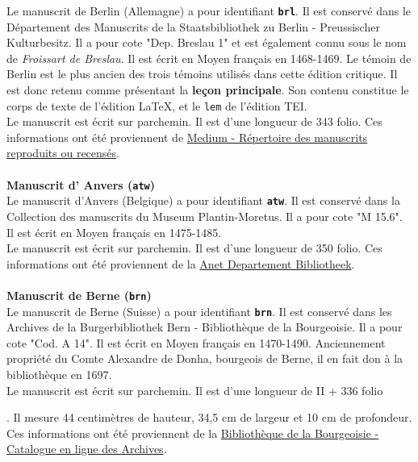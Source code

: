 \documentclass[12pt, a4paper]{article}
\begin{document}
	\indent Le manuscrit de Berlin (Allemagne) a pour identifiant \textbf{\texttt{brl}}. Il est conservé dans le Département des Manuscrits de la  Staatsbibliothek zu Berlin - Preussischer Kulturbesitz. Il a pour cote "Dep. Breslau 1" et est également connu sous le nom de \textit{Froissart de Breslau}. Il est écrit en Moyen français en 1468-1469. Le témoin de Berlin est le plus ancien des trois témoins utilisés dans cette édition critique. Il est donc retenu comme présentant la \textbf{leçon principale}.
	Son contenu constitue le corps de texte de l'édition \LaTeX, et
	le \texttt{lem} de l'édition TEI.\\ \indent Le manuscrit est écrit sur parchemin. Il est d'une longueur de 343 folio. Ces informations ont été proviennent de \href{http://medium-avance.irht.cnrs.fr/ark:/63955/md44pk02gf53}{Medium - Répertoire des manuscrits reproduits ou recensés}.\\~\\\noindent \textbf{Manuscrit d' Anvers (\texttt{atw})}\\
	
	\indent Le manuscrit d'Anvers (Belgique) a pour identifiant \textbf{\texttt{atw}}. Il est conservé dans la Collection des manuscrits du  Museum Plantin-Moretus. Il a pour cote "M 15.6". Il est écrit en Moyen français en 1475-1485.\\ \indent Le manuscrit est écrit sur parchemin. Il est d'une longueur de 350 folio. Ces informations ont été proviennent de la \href{https://anet.be/record/opacmpm/c:lvd:14057240/F}{Anet Departement Bibliotheek}.\\~\\\noindent \textbf{Manuscrit de Berne (\texttt{brn})}\\
	
	\indent Le manuscrit de Berne (Suisse) a pour identifiant \textbf{\texttt{brn}}. Il est conservé dans les Archives de la  Burgerbibliothek Bern - Bibliothèque de la Bourgeoisie. Il a pour cote "Cod. A 14". Il est écrit en Moyen français en 1470-1490. Anciennement propriété du Comte Alexandre de Donha, bourgeois de Berne, il en fait don à la bibliothèque en 1697.\\ \indent Le manuscrit est écrit sur parchemin. Il est d'une longueur de II + 336 folio
	
	. Il mesure 44 centimètres de hauteur, 34,5 cm de largeur et 10 cm de profondeur. Ces informations ont été proviennent de la \href{http://katalog.burgerbib.ch/detail.aspx?ID=147296}{Bibliothèque de la Bourgeoisie - Catalogue en ligne des Archives}.
\end{document}
